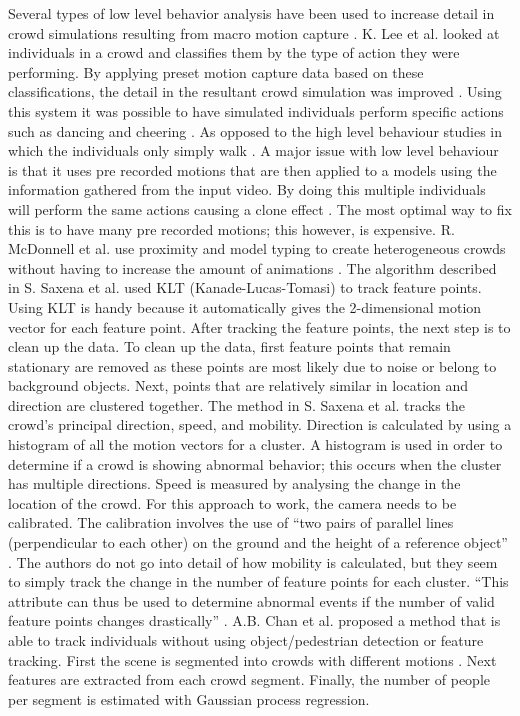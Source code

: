 \documentclass[12pt, onecolumn, conference]{IEEEtran}
\begin{document}
Several types of low level behavior analysis have been used to increase detail in crowd simulations resulting from macro motion capture \cite{K. Lee}. K. Lee et al. looked at individuals in a crowd and classifies them by the type of action they were performing. By applying preset motion capture data based on these classifications, the detail in the resultant crowd simulation was improved \cite{K. Lee}. 
Using this system it was possible to have simulated individuals perform specific actions such as dancing and cheering \cite{K. Lee}. As opposed to the high level behaviour studies in which the individuals only simply walk \cite{N. Courty}\cite{R. Mehran}.
A major issue with low level behaviour is that it uses pre recorded motions that are then applied to a models using the information gathered from the input video. By doing this multiple individuals will perform the same actions causing a clone effect \cite{R. McDonnell}. The most optimal way to fix this is to have many pre recorded motions; this however, is expensive. R. McDonnell et al. use proximity and model typing to create heterogeneous crowds without having to increase the amount of animations \cite{R. McDonnell}.
The algorithm described in S. Saxena et al. used KLT (Kanade-Lucas-Tomasi) to track feature points. Using KLT is handy because it automatically gives the 2-dimensional motion vector for each feature point. After tracking the feature points, the next step is to clean up the data. To clean up the data, first feature points that remain stationary are removed as these points are most likely due to noise or belong to background objects. Next, points that are relatively similar in location and direction are clustered together.
The method in S. Saxena et al. tracks the crowd’s principal direction, speed, and mobility. Direction is calculated by using a histogram of all the motion vectors for a cluster. A histogram is used in order to determine if a crowd is showing abnormal behavior; this occurs when the cluster has multiple directions. Speed is measured by analysing the change in the location of the crowd. For this approach to work, the camera needs to be calibrated. The calibration involves the use of “two pairs of parallel lines (perpendicular to each other) on the ground and the height of a reference object” \cite{S. Saxena}. The authors do not go into detail of how mobility is calculated, but they seem to simply track the change in the number of feature points for each cluster. “This attribute can thus be used to determine abnormal events if the number of valid feature points changes drastically” \cite{S. Saxena}.
A.B. Chan et al. proposed a method that is able to track individuals without using  object/pedestrian detection or feature tracking. First the scene is segmented into crowds with different motions \cite{A.B. Chan}. Next features are extracted from each crowd segment. Finally, the number of people per segment is estimated with Gaussian process regression.
\end{document}
